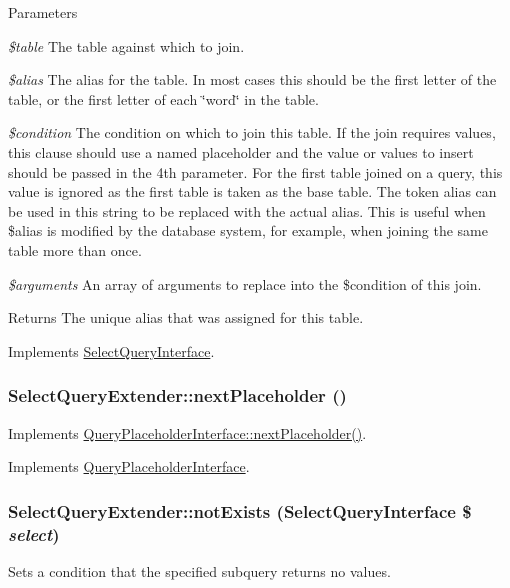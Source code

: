 \begin{DoxyParams}{Parameters}
\item[{\em \$table}]The table against which to join. \item[{\em \$alias}]The alias for the table. In most cases this should be the first letter of the table, or the first letter of each \char`\"{}word\char`\"{} in the table. \item[{\em \$condition}]The condition on which to join this table. If the join requires values, this clause should use a named placeholder and the value or values to insert should be passed in the 4th parameter. For the first table joined on a query, this value is ignored as the first table is taken as the base table. The token alias can be used in this string to be replaced with the actual alias. This is useful when \$alias is modified by the database system, for example, when joining the same table more than once. \item[{\em \$arguments}]An array of arguments to replace into the \$condition of this join. \end{DoxyParams}
\begin{DoxyReturn}{Returns}
The unique alias that was assigned for this table. 
\end{DoxyReturn}


Implements \hyperlink{interfaceSelectQueryInterface_ab3dcfdd428727d5a2f4890296807b27a}{SelectQueryInterface}.\hypertarget{classSelectQueryExtender_a202a005bca32569d69f1cc20acdb8ccb}{
\subsubsection[{nextPlaceholder}]{\setlength{\rightskip}{0pt plus 5cm}SelectQueryExtender::nextPlaceholder ()}}
\label{classSelectQueryExtender_a202a005bca32569d69f1cc20acdb8ccb}
Implements \hyperlink{interfaceQueryPlaceholderInterface_a6ec3008deb25380042178419cc601b37}{QueryPlaceholderInterface::nextPlaceholder()}. 

Implements \hyperlink{interfaceQueryPlaceholderInterface_a6ec3008deb25380042178419cc601b37}{QueryPlaceholderInterface}.\hypertarget{classSelectQueryExtender_a0cd2b1d2e813fc6b8280221f6ca40777}{
\subsubsection[{notExists}]{\setlength{\rightskip}{0pt plus 5cm}SelectQueryExtender::notExists ({\bf SelectQueryInterface} \$ {\em select})}}
\label{classSelectQueryExtender_a0cd2b1d2e813fc6b8280221f6ca40777}
Sets a condition that the specified subquery returns no values.


